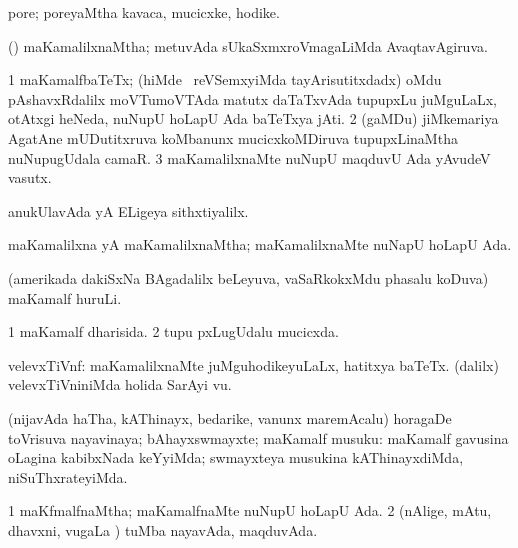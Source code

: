 \bentry
{}
\gl{\nA}
\bmng
 pore; poreyaMtha kavaca, mucicxke, hodike. 
\emng
\eentry

\bentry
{} 
\gl{\gu}
\expl{}
\bmng
 (\savi) maKamalilxnaMtha; metuvAda sUkaSxmxroVmagaLiMda AvaqtavAgiruva. 
\emng
\eentry

\bentry
{} 
\gl{\nA}
\expl{}
\bmng
\bnum
\num{1} maKamalfbaTeTx; (hiMde \kanmu\ reVSemxyiMda tayArisutitxdadx) oMdu pAshavxRdalilx moVTumoVTAda matutx daTaTxvAda tupupxLu juMguLaLx, otAtxgi heNeda, nuNupU hoLapU Ada baTeTxya jAti. 
\num{2} (gaMDu) jiMkemariya AgatAne mUDutitxruva koMbanunx mucicxkoMDiruva tupupxLinaMtha nuNupugUdala camaR. 
\num{3} maKamalilxnaMte nuNupU maqduvU Ada yAvudeV vasutx. 
\enum
\emng

\noindent 
\gl{\pagu}
\expl{}
\bmng
  anukUlavAda yA ELigeya sithxtiyalilx. 
\emng
\eentry

\bentry
{} 
\gl{\gu}
\expl{}
\bmng
 maKamalilxna yA maKamalilxnaMtha; maKamalilxnaMte nuNapU hoLapU Ada. 
\emng
\eentry

\bentry
{}
\gl{\nA}
\expl{}
\bmng
 (amerikada dakiSxNa BAgadalilx beLeyuva, vaSaRkokxMdu phasalu koDuva) maKamalf huruLi. 
\emng
\eentry

\bentry
{} 
\gl{\gu}
\expl{}
\bmng
\bnum
\num{1} maKamalf dharisida. 
\num{2} tupu pxLugUdalu mucicxda. 
\enum
\emng
\eentry

\bentry
{} 
\gl{\nA}
\expl{}
\bmng
 velevxTiVnf: 
\banum
{} maKamalilxnaMte juMguhodikeyuLaLx, hatitxya baTeTx. 
 (\bava dalilx) velevxTiVniniMda holida SarAyi \mo vu. 
\eanum
\emng
\eentry

\bentry
{}
\gl{\nA}
\expl{}
\bmng
 (nijavAda haTha, kAThinayx, bedarike, \mo vanunx maremAcalu) horagaDe toVrisuva nayavinaya; bAhayxswmayxte; maKamalf musuku:  maKamalf gavusina oLagina kabibxNada keYyiMda; swmayxteya musukina kAThinayxdiMda, niSuThxrateyiMda. 
\emng
\eentry

\bentry
{} 
\gl{\gu}
\expl{}
\bmng
\bnum
\num{1} maKfmalfnaMtha; maKamalfnaMte nuNupU hoLapU Ada. 
\num{2} (nAlige, mAtu, dhavxni, \mo vugaLa \vi) tuMba nayavAda, maqduvAda. 
\enum
\emng
\eentry

